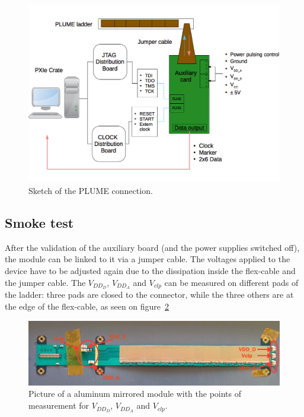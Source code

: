   \begin{figure}[!h]
    \centering
    \includegraphics[width=\textwidth]{Pictures/labTests/plumeAux.png}
    \caption{Sketch of the PLUME connection.}
    \label{fig:plumeAux}
  \end{figure}

  \subsection{Smoke test}

  After the validation of the auxiliary board (and the power supplies switched off), the module can be linked to it via a jumper cable.
  The voltages applied to the device have to be adjusted again due to the dissipation inside the flex-cable and the jumper cable.
  The $V_{DD_D}$, $V_{DD_A}$ and $V_{clp}$ can be measured on different pads of the ladder: three pads are closed to the connector, while the three others are at the edge of the flex-cable, as seen on figure~\ref{fig:voltagePads}

  \begin{figure}[!h]
    \centering
    \includegraphics[width=\textwidth]{Pictures/labTests/AM01_voltagePads.jpg}
    \caption{Picture of a aluminum mirrored module with the points of measurement for $V_{DD_D}$, $V_{DD_A}$ and $V_{clp}$.}
    \label{fig:voltagePads}
  \end{figure}

